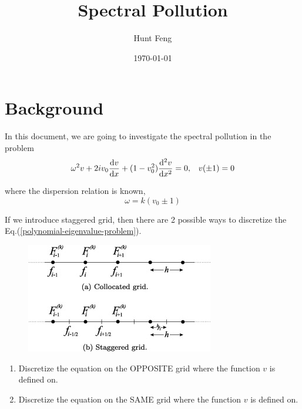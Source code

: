 \documentclass{article}
\title{Spectral Pollution}
\author{Hunt Feng}
\date{\today}
\begin{document}
\maketitle

\section{Background}
In this document, we are going to investigate the spectral pollution in the problem
\begin{equation} \label{polynomial-eigenvalue-problem}
    \omega^2v + 2iv_0\dv{v}{x} + (1-v_0^2)\dv[2]{v}{x} = 0, \;\;\; v(\pm 1) = 0
\end{equation}

where the dispersion relation is known,
\begin{equation} \label{dispersion-relation}
    \omega = k(v_0 \pm 1) 
\end{equation}

If we introduce staggered grid, then there are 2 possible ways to discretize the Eq.(\ref{polynomial-eigenvalue-problem}).

\begin{figure}[H]
    \centering
    \includegraphics[width=0.7\linewidth]{img/staggered-grid.jpg}
\end{figure}

\begin{enumerate}
    \item Discretize the equation on the OPPOSITE grid where the function $v$ is defined on.
    \item Discretize the equation on the SAME grid where the function $v$ is defined on.
\end{enumerate}
\end{document}
